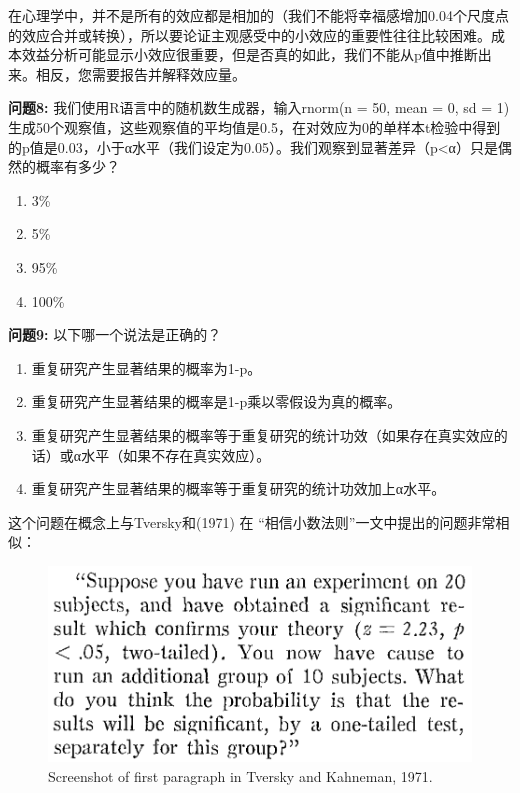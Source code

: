 \documentclass[
  letterpaper,
  DIV=11,
  numbers=noendperiod]{scrreprt}
\providecommand{\tightlist}{%
  \setlength{\itemsep}{0pt}\setlength{\parskip}{0pt}}\usepackage{longtable,booktabs,array}
\begin{document}
在心理学中，并不是所有的效应都是相加的（我们不能将幸福感增加0.04个尺度点的效应合并或转换），所以要论证主观感受中的小效应的重要性往往比较困难。成本效益分析可能显示小效应很重要，但是否真的如此，我们不能从p值中推断出来。相反，您需要报告并解释效应量。

\textbf{问题8:} 我们使用R语言中的随机数生成器，输入rnorm(n = 50, mean =
0, sd =
1)生成50个观察值，这些观察值的平均值是0.5，在对效应为0的单样本t检验中得到的p值是0.03，小于α水平（我们设定为0.05）。我们观察到显著差异（p\textless α）只是偶然的概率有多少？

\begin{enumerate}
\def\labelenumi{\Alph{enumi})}
\tightlist
\item
  3\%
\item
  5\%
\item
  95\%
\item
  100\%
\end{enumerate}

\textbf{问题9:} 以下哪一个说法是正确的？

\begin{enumerate}
\def\labelenumi{\Alph{enumi})}
\tightlist
\item
  重复研究产生显著结果的概率为1-p。
\item
  重复研究产生显著结果的概率是1-p乘以零假设为真的概率。
\item
  重复研究产生显著结果的概率等于重复研究的统计功效（如果存在真实效应的话）或α水平（如果不存在真实效应）。
\item
  重复研究产生显著结果的概率等于重复研究的统计功效加上α水平。
\end{enumerate}

这个问题在概念上与Tversky和(1971) 在
``相信小数法则''一文中提出的问题非常相似：

\begin{figure}

{\centering \includegraphics[width=1\textwidth,height=\textheight]{images/belieflawsmallnumers.png}

}

\caption{\label{fig-smallnumbers}Screenshot of first paragraph in
Tversky and Kahneman, 1971.}

\end{figure}
\end{document}

